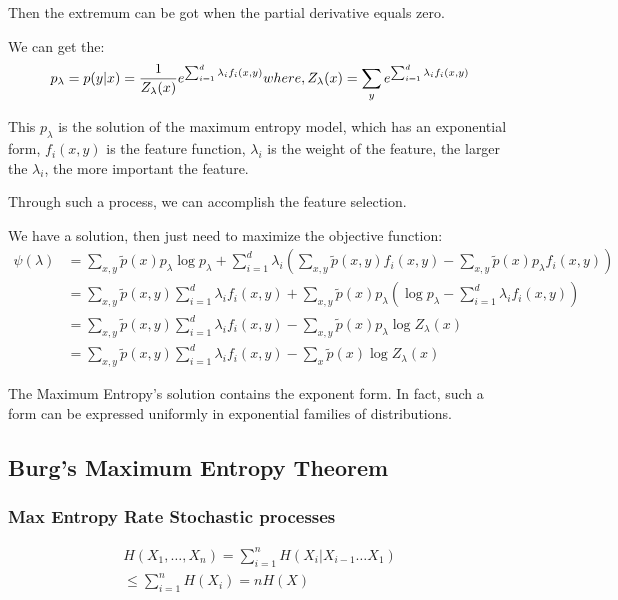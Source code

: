 \documentclass[12pt, a4paper]{article}
\begin{document}
Then the extremum can be got when the partial derivative equals zero.

We can get the:
\begin{equation}
p_\lambda = p(y|x) = \frac{1}{Z_\lambda(x)}e^{\sum_{i=1}^d \lambda_if_i(x, y)} \\ 
where,Z_\lambda(x) =\sum_y e^{\sum_{i=1}^d \lambda_if_i(x, y) } 
\end{equation}


This $p_\lambda$ is the solution of the maximum entropy model, which has an exponential form, $f_i(x,y)$ is the feature function, $\lambda_i$ is the weight of the feature, the larger the $\lambda_i$, the more important the feature. 

Through such a process, we can accomplish the feature selection.

We have a solution, then just need to maximize the 
objective function:
\begin{equation}
	\begin{aligned}
\psi(\lambda) &=\sum_{x, y} \tilde{p}(x) p_{\lambda} \log p_{\lambda}+\sum_{i=1}^{d} \lambda_{i}\left(\sum_{x, y} \tilde{p}(x, y) f_{i}(x, y)-\sum_{x, y} \tilde{p}(x) p_{\lambda} f_{i}(x, y)\right) \\
&=\sum_{x, y} \tilde{p}(x, y) \sum_{i=1}^{d} \lambda_{i} f_{i}(x, y)+\sum_{x, y} \tilde{p}(x) p_{\lambda}\left(\log p_{\lambda}-\sum_{i=1}^{d} \lambda_{i} f_{i}(x, y)\right) \\
&=\sum_{x, y} \tilde{p}(x, y) \sum_{i=1}^{d} \lambda_{i} f_{i}(x, y)-\sum_{x, y} \tilde{p}(x) p_{\lambda} \log Z_{\lambda}(x) \\
&=\sum_{x, y} \tilde{p}(x, y) \sum_{i=1}^{d} \lambda_{i} f_{i}(x, y)-\sum_{x} \tilde{p}(x) \log Z_{\lambda}(x)
\end{aligned}
\end{equation}

The Maximum Entropy's solution contains the exponent
form. In fact, such a form can be expressed uniformly in exponential families of distributions.


\subsection{Burg's Maximum Entropy Theorem}
\subsubsection{Max Entropy Rate Stochastic processes}

\begin{equation}
\begin{aligned}
H\left(X_{1}, \ldots, X_{n}\right)=
\sum_{i=1}^{n} H\left(X_{i} | X_{i-1} \ldots X_{1}\right)
\\\leq 
\sum_{i=1}^{n} H\left(X_{i}\right) 
=n H(X) 
\end{aligned}
\end{equation}
\end{document}
